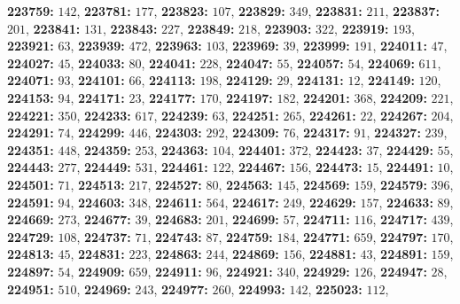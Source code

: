 \textsf{\bfseries 223759:} $142$, \textsf{\bfseries 223781:} $177$, \textsf{\bfseries 223823:} $107$, \textsf{\bfseries 223829:} $349$, \textsf{\bfseries 223831:} $211$, \textsf{\bfseries 223837:} $201$, \textsf{\bfseries 223841:} $131$, \textsf{\bfseries 223843:} $227$, \textsf{\bfseries 223849:} $218$, \textsf{\bfseries 223903:} $322$, \textsf{\bfseries 223919:} $193$, \textsf{\bfseries 223921:} $63$, \textsf{\bfseries 223939:} $472$, \textsf{\bfseries 223963:} $103$, \textsf{\bfseries 223969:} $39$, \textsf{\bfseries 223999:} $191$, \textsf{\bfseries 224011:} $47$, \textsf{\bfseries 224027:} $45$, \textsf{\bfseries 224033:} $80$, \textsf{\bfseries 224041:} $228$, \textsf{\bfseries 224047:} $55$, \textsf{\bfseries 224057:} $54$, \textsf{\bfseries 224069:} $611$, \textsf{\bfseries 224071:} $93$, \textsf{\bfseries 224101:} $66$, \textsf{\bfseries 224113:} $198$, \textsf{\bfseries 224129:} $29$, \textsf{\bfseries 224131:} $12$, \textsf{\bfseries 224149:} $120$, \textsf{\bfseries 224153:} $94$, \textsf{\bfseries 224171:} $23$, \textsf{\bfseries 224177:} $170$, \textsf{\bfseries 224197:} $182$, \textsf{\bfseries 224201:} $368$, \textsf{\bfseries 224209:} $221$, \textsf{\bfseries 224221:} $350$, \textsf{\bfseries 224233:} $617$, \textsf{\bfseries 224239:} $63$, \textsf{\bfseries 224251:} $265$, \textsf{\bfseries 224261:} $22$, \textsf{\bfseries 224267:} $204$, \textsf{\bfseries 224291:} $74$, \textsf{\bfseries 224299:} $446$, \textsf{\bfseries 224303:} $292$, \textsf{\bfseries 224309:} $76$, \textsf{\bfseries 224317:} $91$, \textsf{\bfseries 224327:} $239$, \textsf{\bfseries 224351:} $448$, \textsf{\bfseries 224359:} $253$, \textsf{\bfseries 224363:} $104$, \textsf{\bfseries 224401:} $372$, \textsf{\bfseries 224423:} $37$, \textsf{\bfseries 224429:} $55$, \textsf{\bfseries 224443:} $277$, \textsf{\bfseries 224449:} $531$, \textsf{\bfseries 224461:} $122$, \textsf{\bfseries 224467:} $156$, \textsf{\bfseries 224473:} $15$, \textsf{\bfseries 224491:} $10$, \textsf{\bfseries 224501:} $71$, \textsf{\bfseries 224513:} $217$, \textsf{\bfseries 224527:} $80$, \textsf{\bfseries 224563:} $145$, \textsf{\bfseries 224569:} $159$, \textsf{\bfseries 224579:} $396$, \textsf{\bfseries 224591:} $94$, \textsf{\bfseries 224603:} $348$, \textsf{\bfseries 224611:} $564$, \textsf{\bfseries 224617:} $249$, \textsf{\bfseries 224629:} $157$, \textsf{\bfseries 224633:} $89$, \textsf{\bfseries 224669:} $273$, \textsf{\bfseries 224677:} $39$, \textsf{\bfseries 224683:} $201$, \textsf{\bfseries 224699:} $57$, \textsf{\bfseries 224711:} $116$, \textsf{\bfseries 224717:} $439$, \textsf{\bfseries 224729:} $108$, \textsf{\bfseries 224737:} $71$, \textsf{\bfseries 224743:} $87$, \textsf{\bfseries 224759:} $184$, \textsf{\bfseries 224771:} $659$, \textsf{\bfseries 224797:} $170$, \textsf{\bfseries 224813:} $45$, \textsf{\bfseries 224831:} $223$, \textsf{\bfseries 224863:} $244$, \textsf{\bfseries 224869:} $156$, \textsf{\bfseries 224881:} $43$, \textsf{\bfseries 224891:} $159$, \textsf{\bfseries 224897:} $54$, \textsf{\bfseries 224909:} $659$, \textsf{\bfseries 224911:} $96$, \textsf{\bfseries 224921:} $340$, \textsf{\bfseries 224929:} $126$, \textsf{\bfseries 224947:} $28$, \textsf{\bfseries 224951:} $510$, \textsf{\bfseries 224969:} $243$, \textsf{\bfseries 224977:} $260$, \textsf{\bfseries 224993:} $142$, \textsf{\bfseries 225023:} $112$, 

